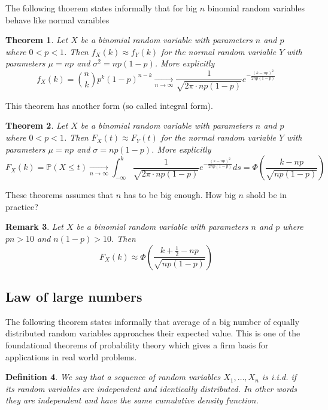 \documentclass[12pt]{article}
\newtheorem{theorem}{Theorem}[subsection]
\newtheorem{remark}[theorem]{Remark}
\newtheorem{definition}[theorem]{Definition}
\begin{document}
The following thoerem states informally that for big $n$ binomial random variables behave like normal varaibles

\begin{theorem} Let $X$ be a binomial random variable with parameters $n$ and $p$ where $0<p<1$. Then $f_X(k)\approx f_Y(k)$ for the normal random variable $Y$ with parameters $\mu=np$ and $\sigma^2=np(1-p)$. More explicitly
$$
f_X(k)
={n\choose k}p^k (1-p)^{n-k}
\underset{n\to\infty}{\to}\frac{1}{\sqrt{2\pi \cdot np(1-p)}}e^{-\frac{(k-np)^2}{2np(1-p)}}
$$
\end{theorem} 

This theorem has another form (so called integral form).

\begin{theorem} Let $X$ be a binomial random variable with parameters $n$ and $p$ where $0<p<1$. Then $F_X(t)\approx F_Y(t)$ for the normal random variable $Y$ with parameters $\mu=np$ and $\sigma=np(1-p)$. More explicitly
$$
F_X(k)
=\mathbb{P}(X\leq t)
\underset{n\to\infty}{\to}\int_{-\infty}^k \frac{1}{\sqrt{2\pi \cdot np(1-p)}} e^{-\frac{(s-np)^2}{2np(1-p)}}ds
=\Phi\left(\frac{k-np}{\sqrt{np(1-p)}}\right)
$$
\end{theorem} 

These theorems assumes that $n$ has to be big enough. How big $n$ shold be in practice?

\begin{remark} Let $X$ be a binomial random variable with parameters $n$ and $p$ where $pn>10$ and $n(1-p)>10$.  Then
$$
F_X(k)\approx\Phi\left(\frac{k+\frac{1}{2}-np}{\sqrt{np(1-p)}}\right)
$$
\end{remark} 

\subsection{Law of large numbers}

The following theorem states informally that average of a big number of equally distributed random variables approaches their expected value. This is one of the foundational theorems of probability theory which gives a firm basis for applications in real world problems.

\begin{definition} We say that a sequence of random variables $X_1,\ldots,X_n$ is i.i.d. if its random variables are independent and identically distributed. In other words they are independent and have the same cumulative density function.
\end{definition}
\end{document}
